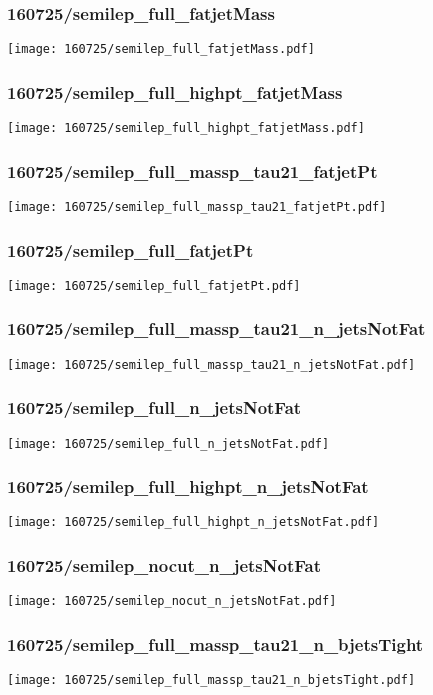 \begin{frame}
   \frametitle{\small 160725/semilep\_full\_fatjetMass}
   \centering
   \texttt{[image: 160725/semilep\_full\_fatjetMass.pdf]}
\end{frame}

\begin{frame}
   \frametitle{\small 160725/semilep\_full\_highpt\_fatjetMass}
   \centering
   \texttt{[image: 160725/semilep\_full\_highpt\_fatjetMass.pdf]}
\end{frame}

\begin{frame}
   \frametitle{\small 160725/semilep\_full\_massp\_tau21\_fatjetPt}
   \centering
   \texttt{[image: 160725/semilep\_full\_massp\_tau21\_fatjetPt.pdf]}
\end{frame}

\begin{frame}
   \frametitle{\small 160725/semilep\_full\_fatjetPt}
   \centering
   \texttt{[image: 160725/semilep\_full\_fatjetPt.pdf]}
\end{frame}

\begin{frame}
   \frametitle{\small 160725/semilep\_full\_massp\_tau21\_n\_jetsNotFat}
   \centering
   \texttt{[image: 160725/semilep\_full\_massp\_tau21\_n\_jetsNotFat.pdf]}
\end{frame}

\begin{frame}
   \frametitle{\small 160725/semilep\_full\_n\_jetsNotFat}
   \centering
   \texttt{[image: 160725/semilep\_full\_n\_jetsNotFat.pdf]}
\end{frame}

\begin{frame}
   \frametitle{\small 160725/semilep\_full\_highpt\_n\_jetsNotFat}
   \centering
   \texttt{[image: 160725/semilep\_full\_highpt\_n\_jetsNotFat.pdf]}
\end{frame}

\begin{frame}
   \frametitle{\small 160725/semilep\_nocut\_n\_jetsNotFat}
   \centering
   \texttt{[image: 160725/semilep\_nocut\_n\_jetsNotFat.pdf]}
\end{frame}

\begin{frame}
   \frametitle{\small 160725/semilep\_full\_massp\_tau21\_n\_bjetsTight}
   \centering
   \texttt{[image: 160725/semilep\_full\_massp\_tau21\_n\_bjetsTight.pdf]}
\end{frame}

